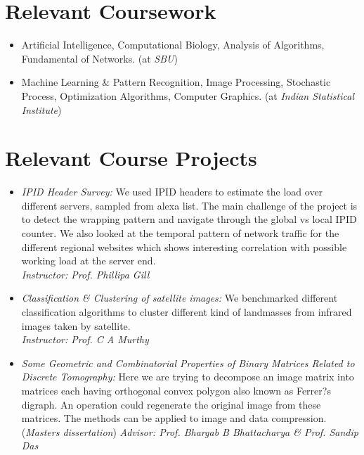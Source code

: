 \documentclass{res}
\begin{document}
\begin{resume}
\section{Relevant Coursework} 
\begin{itemize}
\item Artificial Intelligence,  Computational Biology, Analysis of Algorithms, Fundamental of Networks. (at {\it SBU})
\item Machine Learning \& Pattern Recognition, Image Processing, Stochastic Process, Optimization Algorithms, Computer Graphics. (at {\it
Indian Statistical Institute})
\end{itemize}



\section{Relevant Course Projects}
\begin{itemize}
 \item{ \it{IPID Header Survey:}} We used IPID headers to estimate the load over different servers, sampled from alexa
 list. The main challenge of the project is to detect the wrapping pattern and navigate through the global vs local IPID counter. 
 We also looked at the temporal pattern of network traffic for the different regional websites which shows interesting correlation with possible 
 working load at the server end. \\
 {\it Instructor: Prof. Phillipa Gill}
 
 
 \item {{\it Classification \& Clustering of satellite images:}} We benchmarked different classification algorithms to cluster different 
 kind of landmasses from infrared images taken by satellite. \\
 {\it Instructor: Prof. C A Murthy}
  
 \item {{\it Some Geometric and Combinatorial Properties of Binary Matrices Related to
Discrete Tomography:}} Here we are trying to decompose an image matrix into matrices
each having orthogonal convex polygon also known as Ferrer?s digraph. An operation could
regenerate the original image from these matrices. The methods can be applied to image and
data compression. ({\it Masters dissertation}) 
{\it Advisor: Prof. Bhargab B Bhattacharya \& Prof. Sandip Das}


\end{itemize}
\end{resume}
\end{document}
